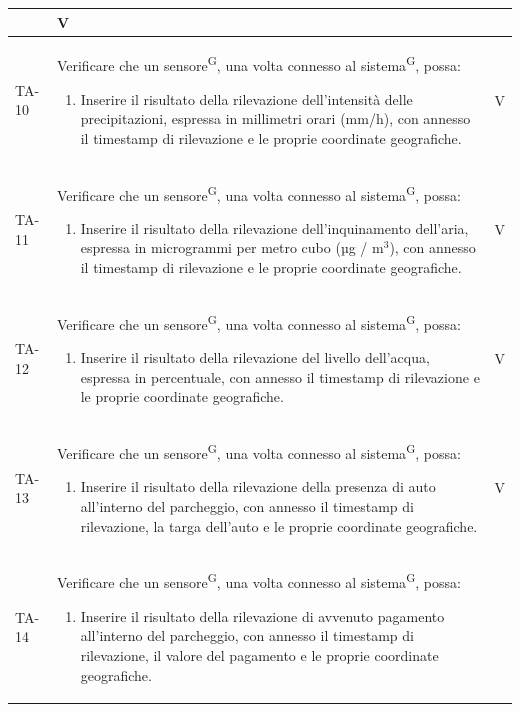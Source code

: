 \documentclass[8pt]{article}
\newcommand{\glossterm}[1]{#1\textsuperscript{G}} %
\begin{document}
\begin{longtable}{|>{\centering}p{2cm}|>{\RaggedRight}m{12cm}|>{\centering\arraybackslash}p{2cm}|}
\begin{enumerate}
    \end{enumerate}
    & V \\
    \hline
    TA-10 &
    Verificare che un \glossterm{sensore}, una volta connesso al \glossterm{sistema}, possa:
    \begin{enumerate}
    \item Inserire il risultato della rilevazione dell'intensità delle precipitazioni, espressa in millimetri orari (mm/h), con annesso il timestamp di rilevazione e le proprie coordinate geografiche.
    \end{enumerate}
    & V \\
    \hline
    TA-11 &
    Verificare che un \glossterm{sensore}, una volta connesso al \glossterm{sistema}, possa:
    \begin{enumerate}
    \item Inserire il risultato della rilevazione dell’inquinamento dell'aria, espressa in microgrammi per metro cubo (µg / $\mbox{m}^{\mbox{3}}$), con annesso il timestamp di rilevazione e le proprie coordinate geografiche.
    \end{enumerate}
    & V \\
    \hline
    TA-12 &
    Verificare che un \glossterm{sensore}, una volta connesso al \glossterm{sistema}, possa:
    \begin{enumerate}
    \item Inserire il risultato della rilevazione del livello dell'acqua, espressa in percentuale, con annesso il timestamp di rilevazione e le proprie coordinate geografiche.
    \end{enumerate}
    & V \\
    \hline
    TA-13 &
    Verificare che un \glossterm{sensore}, una volta connesso al \glossterm{sistema}, possa:
    \begin{enumerate}
    \item  Inserire il risultato della rilevazione della presenza di auto all’interno del
        parcheggio, con annesso il timestamp di rilevazione, la targa dell'auto e le proprie coordinate geografiche. 
    \end{enumerate}
    & V \\
    \hline
    TA-14 &
    Verificare che un \glossterm{sensore}, una volta connesso al \glossterm{sistema}, possa:
    \begin{enumerate}
    \item Inserire il risultato della rilevazione di avvenuto pagamento all’interno del
        parcheggio, con annesso il timestamp di rilevazione, il valore del pagamento e le proprie coordinate geografiche. 

\end{enumerate}
\end{longtable}
\end{document}
